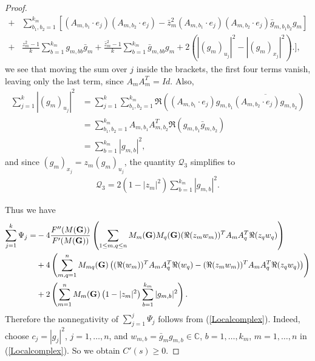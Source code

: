 \documentclass[9pt, a4paper]{amsart}
\newcommand{\1}{{\chi_{}}}%
\numberwithin{equation}{section}
\begin{document}
\begin{proof}
\begin{align*}
			+&\sum_{b_1, b_2=1}^{k_m}\left[(A_{m,b_1}\cdot e_j) (A_{m,b_2}\cdot e_j)-\bar{z}_m^2(A_{m,b_1}\cdot e_j) (A_{m,b_2}\cdot e_j)\bar{g}_{m,b_1b_2}g_m\right]\\
			+&\frac{z_m^2-1}{k}\sum_{b=1}^{k_m}g_{m,bb}\bar{g}_m +\frac{\bar{z}_m^2-1}{k}\sum_{b=1}^{k_m}\bar{g}_{m,bb}g_m+2(|(g_m)_{u_j}|^2 -|(g_m)_{x_j}|^2)\Bigg.\Bigg],
		\end{align*}
		we see that  moving the sum over $j$ inside the brackets, the first four terms vanish, leaving only the last term, since $A_mA^T_m=Id$. Also,
		\begin{align*}
			\sum_{j=1}^k|(g_m)_{u_j}|^2&=\sum_{j=1}^k\sum_{b_1, b_2=1}^{k_m}\Re((A_{m,b_1}\cdot e_j)g_{m,b_1}\overline{(A_{m,b_2}\cdot e_j)g_{m,b_2}})\\
			&=\sum_{b_1, b_2=1}^{k_m} A_{m,b_1}A_{m,b_2}^T\Re(g_{m,b_1}\bar{g}_{m,b_2})\\
			&=\sum_{b=1}^{k_m}|g_{m,b}|^2,
		\end{align*}
		and since $(g_m)_{x_j}=z_m(g_m)_{u_j}$, the quantity $	\mathcal{Q}_3$ simplifies to 
		\begin{align*}
			\mathcal{Q}_3=2\left(1-|z_m|^2 \right)\sum_{b=1}^{k_m}|g_{m,b}|^2.
		\end{align*}

        Thus we have 
        	\begin{align*}		\sum_{j=1}^k\Psi_j=&-4\frac{F''(M({\bf{G}}))}{F'(M({\bf{G}}))}\left(\sum_{1\leq m,q\leq n}  M_{m}({\bf{G}})M_{q}({\bf{G}}) (\Re(z_mw_{m}))^T A_{m} A_{q}^T  \Re(z_qw_{q})  \right)\\
			&+4\left(\sum_{ m, q=1}^{n} M_{mq}({\bf{G}})\left( (\Re(w_{m}))^T A_{m} A_{q}^T  \Re(w_{q})  -  (\Re(z_mw_{m}))^T A_{m} A_{q}^T  \Re(z_qw_{q}) \right)\right)\\
			&+2\left(\sum_{m=1}^n M_{m}({\bf{G}})\left(1-|z_m|^2 \right)\sum_{b=1}^{k_m}|g_{m,b}|^2 \right).
		\end{align*}
        Therefore the nonnegativity of $\sum_{j=1}^{j}\Psi_{j}$ follows from (\ref{Localcomplex}). Indeed, choose $c_{j} = |g_{j}|^{2}$, $j=1,\ldots, n$,  and $w_{m,b} = \bar{g}_{m}g_{m,b} \in \mathbb{C}$, $b=1, \ldots, k_{m}$, $m=1, \ldots, n$ in (\ref{Localcomplex}). 
	So we obtain $C'(s) \geq 0$. 



\end{proof}
\end{document}
